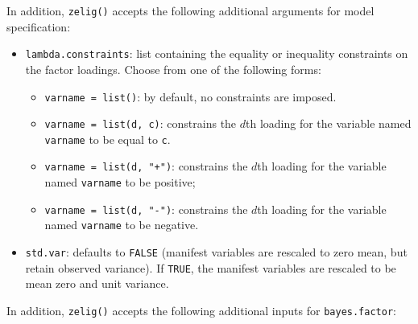 In addition, {\tt zelig()} accepts the following additional arguments for 
model specification: 
\begin{itemize}
\item \texttt{lambda.constraints}: list containing the equality or 
inequality constraints on the factor loadings.  Choose from one of the
following forms:
\begin{itemize}

\item {\tt varname = list()}: by default, no constraints are
imposed.

\item \texttt{varname = list(d, c)}: constrains the
$d$th loading for the variable named \texttt{varname} to be equal to \texttt{c}.

\item \texttt{varname = list(d, "+")}: constrains the
$d$th loading for the variable named \texttt{varname} to be positive;

\item \texttt{varname = list(d, "-")}: constrains the
$d$th loading for the variable named \texttt{varname} to be negative.
\end{itemize} 

\item \texttt{std.var}: defaults to {\tt FALSE} (manifest variables
are rescaled to zero mean, but retain observed variance).  If
\texttt{TRUE}, the manifest variables are rescaled to be mean zero and
unit variance.

\end{itemize}
 In addition, {\tt zelig()} accepts the following additional inputs
for {\tt bayes.factor}:

